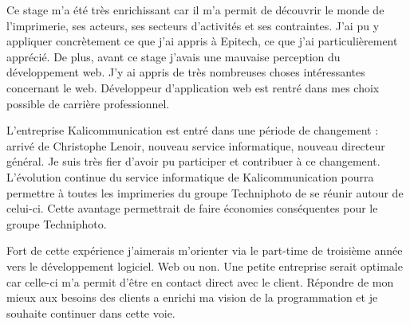 Ce stage m'a été très enrichissant car il m'a permit de découvrir le monde de l'imprimerie, ses acteurs, ses secteurs d'activités et ses contraintes. J'ai pu y appliquer concrètement ce que j'ai appris à Epitech, ce que j'ai particulièrement apprécié. De plus, avant ce stage j'avais une mauvaise perception du développement web. J'y ai appris de très nombreuses choses intéressantes concernant le web. Développeur d'application web est rentré dans mes choix possible de carrière professionnel.\newline

L'entreprise Kalicommunication est entré dans une période de changement : arrivé de Christophe Lenoir, nouveau service informatique, nouveau directeur général. Je suis très fier d'avoir pu participer et contribuer à ce changement. L'évolution continue du service informatique de Kalicommunication pourra permettre à toutes les imprimeries du groupe Techniphoto de se réunir autour de celui-ci. Cette avantage permettrait de faire économies conséquentes pour le groupe Techniphoto.\newline

Fort de cette expérience j'aimerais m'orienter via le part-time de troisième année vers le développement logiciel. Web ou non. Une petite entreprise serait optimale car celle-ci m'a permit d'être en contact direct avec le client. Répondre de mon mieux aux besoins des clients a enrichi ma vision de la programmation et je souhaite continuer dans cette voie.